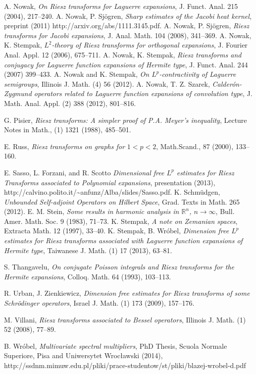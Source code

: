\documentclass[leqno,12pt]{amsart}
\theoremstyle{definition}
\theoremstyle{remark}
\begin{document}
\begin{thebibliography}{16}
 A. Nowak, \textit{On Riesz transforms for Laguerre expansions},
J. Funct. Anal. 215 (2004), 217--240.
 A. Nowak, P. Sj\"ogren, \textit{Sharp estimates of the Jacobi heat kernel}, preprint (2011) http://arxiv.org/abs/1111.3145.pdf.
 A. Nowak, P. Sj\"ogren,
\textit{Riesz transforms for Jacobi expansions}, J. Anal. Math. 104 (2008), 341--369.
A{.} Nowak, K{.} Stempak,
\emph{$L^2$-theory of Riesz transforms for orthogonal expansions},
J{.} Fourier Anal{.} Appl{.} 12 (2006), 675--711.
 A. Nowak, K. Stempak, \textit{Riesz transforms and conjugacy for Laguerre function expansions of Hermite type}, J. Funct. Anal. 244 (2007) 399--433.
A{.} Nowak and K{.} Stempak,
\emph{On $L^p$-contractivity of Laguerre semigroups},
Illinois J{.} Math{.} (4) 56 (2012).
 A. Nowak, T. Z. Szarek, \textit{Calder\'on-Zygmund operators related to Laguerre function expansions of convolution type}, J. Math. Anal. Appl. (2) 388 (2012), 801--816.

G{.} Pisier,
\emph{Riesz transforms: A simpler proof of P.A. Meyer's inequality},
Lecture Notes in Math., (1) 1321 (1988), 485--501.

 E. Russ, \textit{Riesz transforms on graphs for $1<p<2$}, Math.Scand., 87 (2000), 133--160.

 E. Sasso, L. Forzani, and R. Scotto \textit{Dimensional free $L^p$ estimates for Riesz Transforms
associated to Polynomial expansions}, presentation (2013), http://calvino.polito.it/\textasciitilde anfunz/Alba/slides/Sasso.pdf.
 K. Schm\"udgen, \textit{Unbounded Self-adjoint Operators on Hilbert Space}, Grad. Texts in Math. 265 (2012).
 E. M. Stein, \textit{Some results in harmonic analysis in $\mathbb R^n$, $n\to \infty$},
Bull. Amer. Math. Soc. 9 (1983), 71--73.
 K. Stempak, \textit{A note on Zemanian spaces}, Extracta Math. 12 (1997), 33--40.
 K. Stempak, B. Wr\'obel, \textit{Dimension free $L^p$ estimates for Riesz transforms associated with Laguerre
function expansions of Hermite type}, Taiwanese J. Math. (1) 17 (2013), 63--81.

 S. Thangavelu, \textit{On conjugate Poisson integrals and Riesz transforms for the Hermite expansions}, Colloq. Math. 64 (1993), 103--113.

 R. Urban, J. Zienkiewicz, \textit{Dimension free estimates for Riesz transforms of some Schrödinger operators}, Israel J. Math. (1) 173 (2009), 157--176.

  M. Villani, \textit{Riesz transforms associated to Bessel operators}, Illinois J. Math. (1) 52 (2008), 77--89.

 B. Wr\'obel, \textit{Multivariate spectral multipliers}, PhD Thesis, Scuola Normale Superiore, Pisa and Uniwersytet Wroc\l awski (2014), http://ssdnm.mimuw.edu.pl/pliki/prace-studentow/st/pliki/blazej-wrobel-d.pdf
\end{thebibliography}
\end{document}
